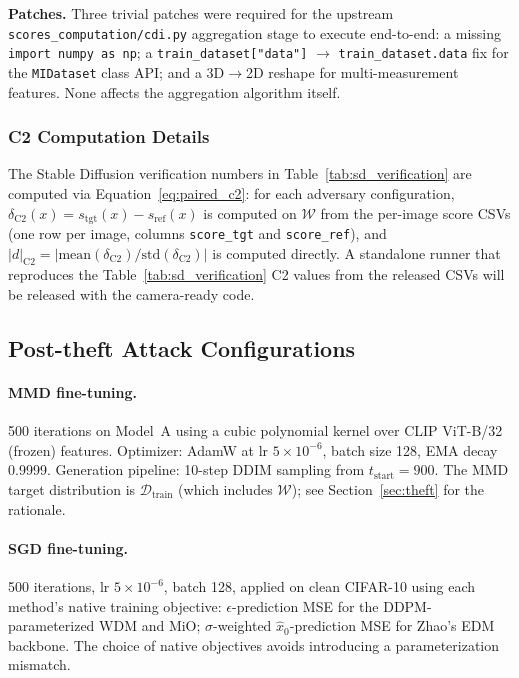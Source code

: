 \documentclass{article}
\begin{document}
\textbf{Patches.} Three trivial patches were required for the upstream \texttt{scores\_computation/cdi.py} aggregation stage to execute end-to-end: a missing \texttt{import numpy as np}; a \texttt{train\_dataset["data"]} $\to$ \texttt{train\_dataset.data} fix for the \texttt{MIDataset} class API; and a 3D$\to$2D reshape for multi-measurement features. None affects the aggregation algorithm itself.

\subsubsection{C2 Computation Details}

The Stable Diffusion verification numbers in Table~\ref{tab:sd_verification} are computed via Equation~\ref{eq:paired_c2}: for each adversary configuration, $\delta_{\text{C2}}(x) = s_{\text{tgt}}(x) - s_{\text{ref}}(x)$ is computed on $\mathcal{W}$ from the per-image score CSVs (one row per image, columns \texttt{score\_tgt} and \texttt{score\_ref}), and $|d|_{\text{C2}} = |\text{mean}(\delta_{\text{C2}}) / \text{std}(\delta_{\text{C2}})|$ is computed directly. A standalone runner that reproduces the Table~\ref{tab:sd_verification} C2 values from the released CSVs will be released with the camera-ready code.

\subsection{Post-theft Attack Configurations}

\paragraph{MMD fine-tuning.} 500 iterations on Model~A using a cubic polynomial kernel over CLIP ViT-B/32 (frozen) features. Optimizer: AdamW at lr $5{\times}10^{-6}$, batch size 128, EMA decay 0.9999. Generation pipeline: 10-step DDIM sampling from $t_{\text{start}}{=}900$. The MMD target distribution is $\mathcal{D}_{\text{train}}$ (which includes $\mathcal{W}$); see Section~\ref{sec:theft} for the rationale.

\paragraph{SGD fine-tuning.} 500 iterations, lr $5{\times}10^{-6}$, batch 128, applied on clean CIFAR-10 using each method's native training objective: $\epsilon$-prediction MSE for the DDPM-parameterized WDM and MiO; $\sigma$-weighted $\hat{x}_0$-prediction MSE for Zhao's EDM backbone. The choice of native objectives avoids introducing a parameterization mismatch.
\end{document}
